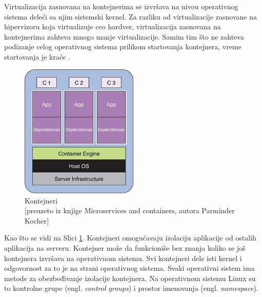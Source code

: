 \documentclass[12pt,oneside]{memoir}
\begin{document}
Virtualizacija zasnovana na kontejnerima se izvršava na nivou operativnog sistema deleći sa njim sistemski kernel. Za razliku od virtualizacije zasnovane na hipervizoru koja virtualizuje ceo hardver, virtualizacija zasnovana na kontejnerima zahteva mnogo manje virtualizacije. Samim tim što ne zahteva podizanje celog operativnog sistema prilikom startovanja kontejnera, vreme startovanja je kraće \cite{gswc}. 
 
\begin{figure}[!ht]
  \centering
  \includegraphics[width=0.5\textwidth]{Slika 4.jpg}
  \caption{Kontejneri\\\footnotesize[preuzeto iz knjige Microservices and containers, autora Parminder Kocher]}
  \label{fig:kontejneri}
\end{figure}


Kao što se vidi na Slici \ref{fig:kontejneri}. Kontejneri omogućavaju izolaciju aplikacije od ostalih aplikacija na serveru. Kontejner može da funkcioniše bez znanja koliko se još kontejnera izvršava na operativnom sistemu. Svi kontejneri dele isti kernel i odgovornost za to je na strani operativnog sistema. Svaki operativni sistem ima metode za obezbeđivanje izolacije kontejnera. Na operativnom sistemu Linux su to kontrolne grupe (engl. \emph{control groups}) i prostor imenovanja (engl. \emph{namespace}). 
\end{document}
